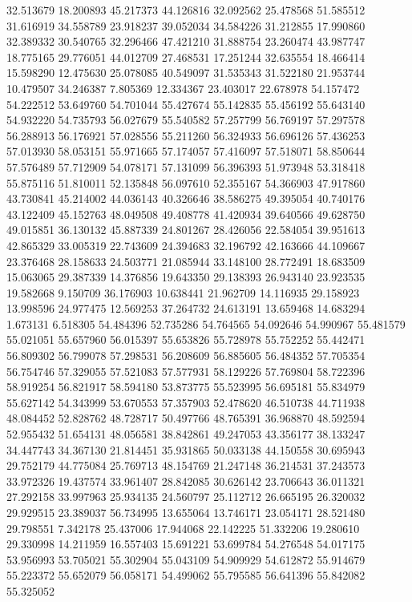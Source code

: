 32.513679
18.200893
45.217373
44.126816
32.092562
25.478568
51.585512
31.616919
34.558789
23.918237
39.052034
34.584226
31.212855
17.990860
32.389332
30.540765
32.296466
47.421210
31.888754
23.260474
43.987747
18.775165
29.776051
44.012709
27.468531
17.251244
32.635554
18.466414
15.598290
12.475630
25.078085
40.549097
31.535343
31.522180
21.953744
10.479507
34.246387
7.805369
12.334367
23.403017
22.678978
54.157472
54.222512
53.649760
54.701044
55.427674
55.142835
55.456192
55.643140
54.932220
54.735793
56.027679
55.540582
57.257799
56.769197
57.297578
56.288913
56.176921
57.028556
55.211260
56.324933
56.696126
57.436253
57.013930
58.053151
55.971665
57.174057
57.416097
57.518071
58.850644
57.576489
57.712909
54.078171
57.131099
56.396393
51.973948
53.318418
55.875116
51.810011
52.135848
56.097610
52.355167
54.366903
47.917860
43.730841
45.214002
44.036143
40.326646
38.586275
49.395054
40.740176
43.122409
45.152763
48.049508
49.408778
41.420934
39.640566
49.628750
49.015851
36.130132
45.887339
24.801267
28.426056
22.584054
39.951613
42.865329
33.005319
22.743609
24.394683
32.196792
42.163666
44.109667
23.376468
28.158633
24.503771
21.085944
33.148100
28.772491
18.683509
15.063065
29.387339
14.376856
19.643350
29.138393
26.943140
23.923535
19.582668
9.150709
36.176903
10.638441
21.962709
14.116935
29.158923
13.998596
24.977475
12.569253
37.264732
24.613191
13.659468
14.683294
1.673131
6.518305
54.484396
52.735286
54.764565
54.092646
54.990967
55.481579
55.021051
55.657960
56.015397
55.653826
55.728978
55.752252
55.442471
56.809302
56.799078
57.298531
56.208609
56.885605
56.484352
57.705354
56.754746
57.329055
57.521083
57.577931
58.129226
57.769804
58.722396
58.919254
56.821917
58.594180
53.873775
55.523995
56.695181
55.834979
55.627142
54.343999
53.670553
57.357903
52.478620
46.510738
44.711938
48.084452
52.828762
48.728717
50.497766
48.765391
36.968870
48.592594
52.955432
51.654131
48.056581
38.842861
49.247053
43.356177
38.133247
34.447743
34.367130
21.814451
35.931865
50.033138
44.150558
30.695943
29.752179
44.775084
25.769713
48.154769
21.247148
36.214531
37.243573
33.972326
19.437574
33.961407
28.842085
30.626142
23.706643
36.011321
27.292158
33.997963
25.934135
24.560797
25.112712
26.665195
26.320032
29.929515
23.389037
56.734995
13.655064
13.746171
23.054171
28.521480
29.798551
7.342178
25.437006
17.944068
22.142225
51.332206
19.280610
29.330998
14.211959
16.557403
15.691221
53.699784
54.276548
54.017175
53.956993
53.705021
55.302904
55.043109
54.909929
54.612872
55.914679
55.223372
55.652079
56.058171
54.499062
55.795585
56.641396
55.842082
55.325052
